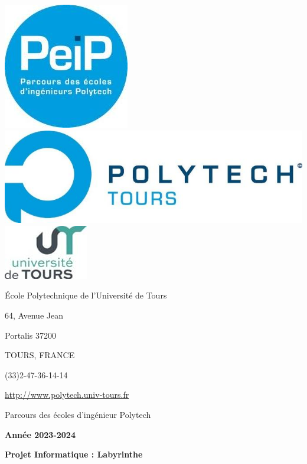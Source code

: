 \documentclass[12pt]{scrreprt} %
\begin{document}

\begin{titlepage}

    \noindent\includegraphics{0.jpg}
    \includegraphics{1.jpg}
    \hfill
    \includegraphics{2.jpg}
    \vspace{1cm}


    École Polytechnique de l'Université de Tours

    64, Avenue Jean

    Portalis 37200

    TOURS, FRANCE

    (33)2-47-36-14-14

    \textcolor{red}{\url{http://www.polytech.univ-tours.fr}}


    \vfill
    \begin{center}

        \Huge
        Parcours des écoles d'ingénieur Polytech
        \vspace{0.3cm}

        \textbf{Année 2023-2024}
        \vspace{0.5cm}


        \textbf{Projet Informatique : Labyrinthe}
    \end{center}
    \vfill


\end{titlepage}
\end{document}
